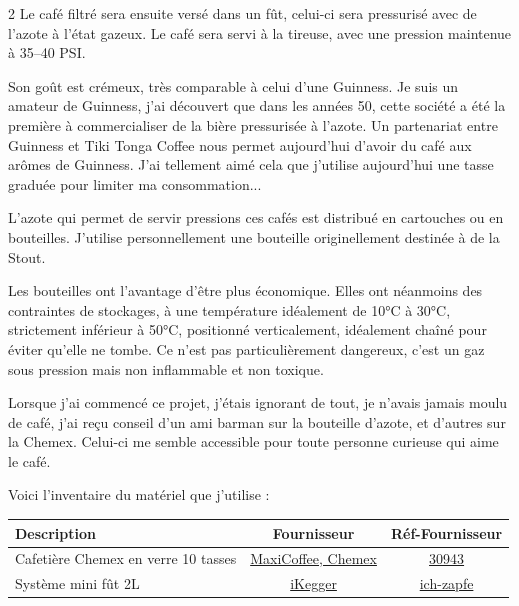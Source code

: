 \documentclass[a4paper,11pt]{article}
\begin{document}
\begin{blogmain}
\begin{multicols}{2}
  Le café filtré sera ensuite versé dans un fût, celui-ci sera pressurisé avec de l'azote à l'état gazeux.
  Le café sera servi à la tireuse, avec une pression maintenue à 35–40 PSI.


  Son goût est crémeux, très comparable à celui d'une Guinness.
  Je suis un amateur de Guinness, j'ai découvert que dans les années 50, cette société a été la première à commercialiser de la bière pressurisée à l'azote.
  Un partenariat entre Guinness et Tiki Tonga Coffee nous permet aujourd'hui d'avoir du café aux arômes de Guinness.
  J'ai tellement aimé cela que j'utilise aujourd'hui une tasse graduée pour limiter ma consommation...


  L'azote qui permet de servir pressions ces cafés est distribué en cartouches ou en bouteilles.
  J'utilise personnellement une bouteille originellement destinée à de la Stout.

  Les bouteilles ont l'avantage d'être plus économique.
  Elles ont néanmoins des contraintes de stockages, à une température idéalement de 10°C à 30°C, strictement inférieur à 50°C, positionné verticalement, idéalement chaîné pour éviter qu'elle ne tombe.
  Ce n'est pas particulièrement dangereux, c'est un gaz sous pression mais non inflammable et non toxique.

  Lorsque j'ai commencé ce projet, j'étais ignorant de tout, je n'avais jamais moulu de café, j'ai reçu conseil d'un ami barman sur la bouteille d'azote, et d'autres sur la Chemex.
  Celui-ci me semble accessible pour toute personne curieuse qui aime le café.
\end{multicols}

Voici l'inventaire du matériel que j'utilise :
\begin{table}[htb]
  \centering
  \begin{tabular}{|l|c|c|}
    \hline \bf Description& \bf Fournisseur& \bf Réf-Fournisseur \\ \hline

    Cafetière Chemex en verre 10 tasses &
    \href{https://www.maxicoffee.com/chemex-m-197.html}{MaxiCoffee, Chemex} &
    \href{https://www.maxicoffee.com/cafetiere-chemex-verre-tasses-p-30943.html}{30943} \\

    Système mini fût 2L &
    \href{https://ikegger.eu/fr}{iKegger} &
    \href{https://ikegger.eu/fr/products/ikegger-2-0-complete-kickstarter-packages}{ich-zapfe} \\


\end{tabular}
\end{table}
\end{blogmain}
\end{document}
